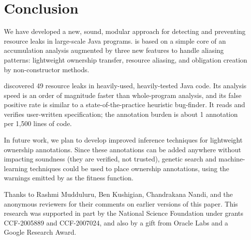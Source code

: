 \documentclass[sigconf,review]{acmart}
\begin{document}
\maketitle



















\section{Conclusion}

We have developed a new, sound, modular approach for detecting and preventing
resource leaks in large-scale Java programs.  \Tool is based on a simple core of
an accumulation analysis augmented by three new features to handle aliasing
patterns: lightweight ownership transfer, resource aliasing, and obligation
creation by non-constructor methods.

\Tool
discovered 49 resource leaks in heavily-used, heavily-tested Java code.
Its analysis speed is an order of magnitude faster
than whole-program analysis, and its false positive rate is similar to a
state-of-the-practice heuristic bug-finder.
It reads and verifies user-written specification; the annotation burden
is about 1 annotation per 1,500 lines of code.

In future work, we plan to develop
improved inference techniques for lightweight ownership annotations.  Since
these annotations can be added anywhere without impacting soundness (they
are verified, not trusted), genetic
search
and machine-learning techniques could be used to place
ownership annotations, using the warnings emitted by \tool as the fitness function.


\begin{acks}
Thanks to Rashmi Mudduluru, Ben Kushigian, Chandrakana Nandi, and the anonymous
reviewers for their comments on earlier versions of this paper.  This research
was supported in part by the National Science Foundation under grants
CCF-2005889 and CCF-2007024, and also by a gift from Oracle Labs and a Google
Research Award.

\end{acks}




\end{document}

